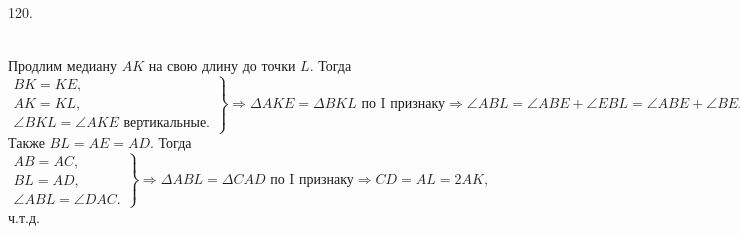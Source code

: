 120. \begin{figure}[ht!]
\end{figure}\\
Продлим медиану $AK$ на свою длину до точки $L.$ Тогда $\left.\begin{array}{l}BK=KE,\\
AK=KL,\\
\angle BKL=\angle AKE\text{ вертикальные.} \end{array}\right\}\Rightarrow \Delta AKE=\Delta BKL\text{ по I признаку}\Rightarrow
\angle ABL=\angle ABE+\angle EBL=\angle ABE+\angle BEA=\angle DAC.$ Также  $BL=AE=AD.$ Тогда
$\left.\begin{array}{l}AB=AC,\\
BL=AD,\\
\angle ABL=\angle DAC. \end{array}\right\}\Rightarrow \Delta ABL=\Delta CAD\text{ по I признаку}\Rightarrow CD=AL=2AK,$ ч.т.д.\newpage\noindent
